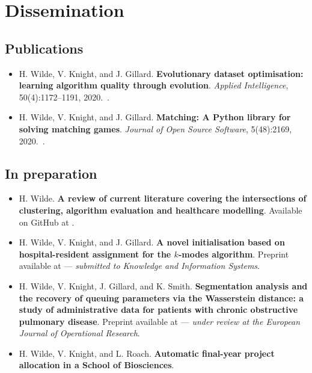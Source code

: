 \chapter*{Dissemination}

\section*{Publications}

\begin{itemize}
    \item H. Wilde, V. Knight, and J. Gillard. \textbf{Evolutionary dataset
        optimisation: learning algorithm quality through evolution}.
        \emph{Applied Intelligence}, 50(4):1172–1191,
        2020.~.
    \item H. Wilde, V. Knight, and J. Gillard. \textbf{Matching: A Python
        library for solving matching games}. \emph{Journal of Open Source
    Software}, 5(48):2169, 2020.~.
\end{itemize}

\section*{In preparation}

\begin{itemize}
    \item H. Wilde. \textbf{A review of current literature covering the
        intersections of clustering, algorithm evaluation and healthcare
        modelling}. Available on GitHub at
        .
    \item H. Wilde, V. Knight, and J. Gillard. \textbf{A novel initialisation
        based on hospital-resident assignment for the \(k\)-modes algorithm}.
        Preprint available at  --- \emph{submitted to
        Knowledge and Information Systems}.
    \item H. Wilde, V. Knight, J. Gillard, and K. Smith. \textbf{Segmentation
        analysis and the recovery of queuing parameters via the Wasserstein
        distance: a study of administrative data for patients with chronic
        obstructive pulmonary disease}. Preprint available at 
        --- \emph{under review at the European Journal of Operational Research}.
    \item H. Wilde, V. Knight, and L. Roach. \textbf{Automatic final-year
        project allocation in a School of Biosciences}.
\end{itemize}

